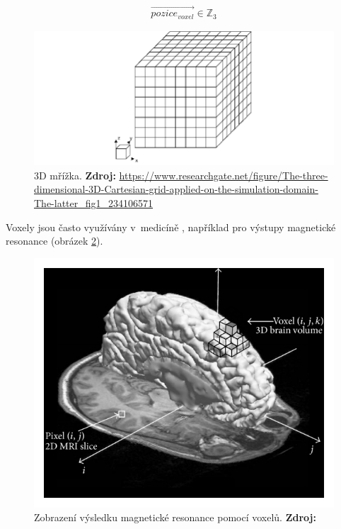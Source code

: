\begin{equation} \label{eq:voxel_coords}
	\begin{gathered}
		\vec{pozice_{voxel}} \in \mathbb{Z}_3
	\end{gathered}
\end{equation}

\begin{figure}[H]
	\centering
	\includegraphics[scale=0.5]{obrazky-figures/3d_grid.png}
	\caption{3D mřížka. \textbf{Zdroj: }\url{https://www.researchgate.net/figure/The-three-dimensional-3D-Cartesian-grid-applied-on-the-simulation-domain-The-latter_fig1_234106571}}
	\label{fig:3d_grid}
\end{figure}

Voxely jsou často využívány v~medicíně \cite{medical_vox}, například pro výstupy magnetické resonance (obrázek \ref{fig:mri_vox}).

\begin{figure}[H]
	\centering
	\includegraphics[scale=1]{obrazky-figures/voxel_mri.png}
	\caption{Zobrazení výsledku magnetické resonance pomocí voxelů. \textbf{Zdroj: \cite{mri}}}
	\label{fig:mri_vox}
\end{figure}

